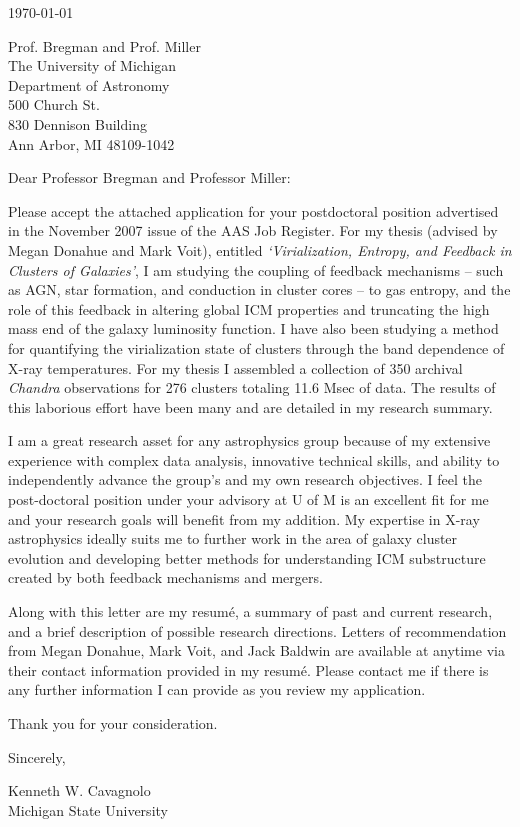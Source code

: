 \documentclass[11pt]{article}
\begin{document}
\today

Prof. Bregman and Prof. Miller\\
The University of Michigan\\
Department of Astronomy\\
500 Church St.\\
830 Dennison Building\\
Ann Arbor, MI 48109-1042

Dear Professor Bregman and Professor Miller:

Please accept the attached application for your postdoctoral
position advertised in the November 2007 issue of the AAS Job
Register. For my thesis (advised by Megan Donahue and  Mark Voit),
entitled {\it `Virialization, Entropy, and Feedback in Clusters of
Galaxies'}, I am studying the coupling of feedback mechanisms -- such
as AGN, star formation, and conduction in cluster cores -- to gas
entropy, and the role of this feedback in altering global ICM
properties and truncating the high mass end of the galaxy luminosity
function. I have also been studying a method for quantifying the
virialization state of clusters through the band dependence of X-ray
temperatures. For my thesis I assembled a collection of 350 archival
{\textit{Chandra}} observations for 276 clusters totaling 11.6 Msec of
data. The results of this laborious effort have been many and are
detailed in my research summary.

I am a great research asset for any astrophysics group because of my
extensive experience with complex data analysis, innovative technical
skills, and ability to independently advance the group's and my own
research objectives. I feel the post-doctoral position under your
advisory at U of M is an excellent fit for me and your research
goals will benefit from my addition. My expertise in X-ray
astrophysics ideally suits me to further work in the area of galaxy
cluster evolution and developing better methods for understanding ICM
substructure created by both feedback mechanisms and mergers.

Along with this letter are my resum\'{e}, a summary of past and
current research, and a brief description of possible research
directions. Letters of recommendation from Megan Donahue, Mark Voit,
and Jack Baldwin are available at anytime via their contact
information provided in my resum\'{e}. Please contact me if there is
any further information I can provide as you review my application.

Thank you for your consideration.

Sincerely,\\
\begin{minipage}{7.5in}
\end{minipage}
Kenneth W. Cavagnolo\\
Michigan State University
\end{document}
